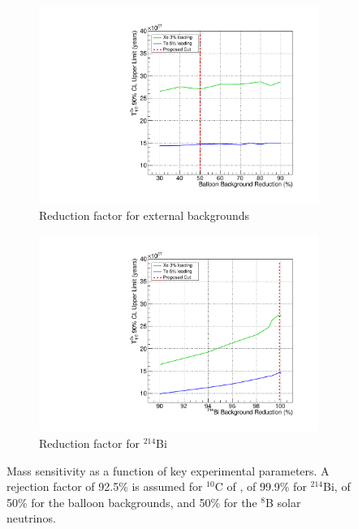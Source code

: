 \begin{figure}
\begin{subfigure}[b]{0.33\textwidth}
 \includegraphics[width=\textwidth]{dbd/externals_reduction_fc.pdf}
 \caption{Reduction factor for external backgrounds}
 \label{fig:scale-ext}
\end{subfigure}
\begin{subfigure}[b]{0.35\textwidth}
 \includegraphics[width=\textwidth]{dbd/bi214_reduction_fc.pdf}
 \caption{Reduction factor for $^{214}$Bi}
 \label{fig:scale-bi214}
\end{subfigure}
\caption{Mass sensitivity as a function of key experimental parameters. A rejection factor of 92.5\% is assumed for $^{10}$C of , of 99.9\% for $^{214}$Bi, of 50\% for the balloon backgrounds, and 50\% for the $^8$B solar neutrinos.}
\label{fig:scaling-plots}
\end{figure}

